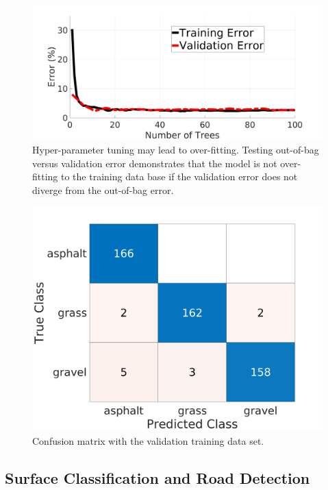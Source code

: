 \documentclass[journal,onecolumn]{IEEEtran}
\begin{document}
			\begin{figure}[H]
				\centering
				\includegraphics[width=0.75\linewidth]{figures/train_vs_valid_overfit_test3}
				\caption[Training vs Validation Error]{Hyper-parameter tuning may lead to over-fitting. Testing out-of-bag versus validation error demonstrates that the model is not over-fitting to the training data base if the validation error does not diverge from the out-of-bag error.}
				\label{fig:train_vs_valid_overfit_test2}
			\end{figure}
		
		
			\begin{figure}[H]
				\centering
				\includegraphics[width=0.55\linewidth]{figures/chan_2c_conf_VALIDATION_mat222}
				\caption[Validation Error]{Confusion matrix with the validation training data set.}
				\label{fig:vali_err_conf_mat}
			\end{figure}
			
		\subsection{Surface Classification and Road Detection}	
		
\end{document}
